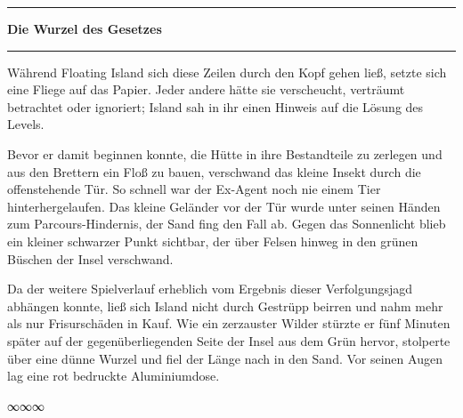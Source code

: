 \noindent \parbox{\textwidth}{ \vspace{3ex} \hrule \vspace{3ex}

\textbf{Die Wurzel des Gesetzes}


\vspace{3ex} \hrule \vspace{3ex} }

Während Floating Island sich diese Zeilen durch den Kopf gehen ließ, setzte sich eine Fliege auf das Papier. Jeder andere hätte sie verscheucht, verträumt betrachtet oder ignoriert; Island sah in ihr einen Hinweis auf die Lösung des Levels.

Bevor er damit beginnen konnte, die Hütte in ihre Bestandteile zu zerlegen und aus den Brettern ein Floß zu bauen, verschwand das kleine Insekt durch die offenstehende Tür. So schnell war der Ex-Agent noch nie einem Tier hinterhergelaufen. Das kleine Geländer vor der Tür wurde unter seinen Händen zum Parcours-Hindernis, der Sand fing den Fall ab. Gegen das Sonnenlicht blieb ein kleiner schwarzer Punkt sichtbar, der über Felsen hinweg in den grünen Büschen der Insel verschwand.

Da der weitere Spielverlauf erheblich vom Ergebnis dieser Verfolgungsjagd abhängen konnte, ließ sich Island nicht durch Gestrüpp beirren und nahm mehr als nur Frisurschäden in Kauf. Wie ein zerzauster Wilder stürzte er fünf Minuten später auf der gegenüberliegenden Seite der Insel aus dem Grün hervor, stolperte über eine dünne Wurzel und fiel der Länge nach in den Sand. Vor seinen Augen lag eine rot bedruckte Aluminiumdose.

\begin{center}
	∞∞∞
\end{center}


